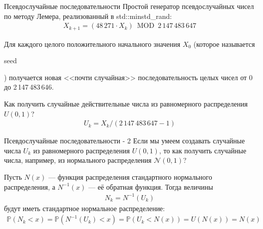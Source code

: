 \documentclass{beamer}
\newcommand{\en}[1]{\begin{otherlanguage}{english}#1\end{otherlanguage}}
\begin{document}
\begin{frame}{Псевдослучайные последовательности}
\justify
Простой генератор псевдослучайных чисел по методу Лемера, реализованный в std::minstd\_rand:
\begin{align*}
X_{k+1} = (48\,271 \cdot X_k) \ \operatorname{MOD} \ 2\,147\,483\,647
\end{align*}

\justify
Для каждого целого положительного начального значения $X_0$ (которое называется \en{seed}) получается новая <<почти случайная>> последовательность целых чисел от 0 до 2\,147\,483\,646.

\justify
Как получить случайные действительные числа из равномерного распределения $U(0, 1)$?
\begin{align*}
U_k = X_k / (2\,147\,483\,647 - 1)
\end{align*}
\end{frame}



\begin{frame}{Псевдослучайные последовательности - 2}
\justify
Если мы умеем создавать случайные числа $U_k$ из равномерного распределения $U(0,1)$, то как получить случайные числа, например, из нормального распределения $\mathcal{N}(0, 1)$?

\justify
Пусть $N(x)$ --- функция распределения стандартного нормального распределения, а $N^{-1}(x)$ --- её обратная функция. Тогда величины
\begin{align*}
N_k = N^{-1}(U_k)
\end{align*}
будут иметь стандартное нормальное распределение:
\begin{align*}
\mathbb{P}(N_k < x) = \mathbb{P}(N^{-1}(U_k) < x) = \mathbb{P}(U_k < N(x)) = U(N(x)) = N(x)
\end{align*}
\end{frame}
\end{document}
